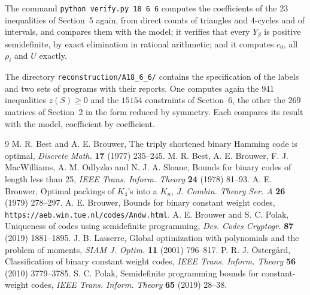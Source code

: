 \documentclass[11pt,a4paper]{article}
\begin{document}
The command \texttt{python verify.py 18 6 6} computes the coefficients of
the $23$ inequalities of Section~5 again, from direct counts of triangles
and $4$-cycles and of intervals, and compares them with the model; it
verifies that every $Y_\beta$ is positive semidefinite, by exact
elimination in rational arithmetic; and it computes $c_0$, all $\rho_i$ and
$U$ exactly.

The directory \texttt{reconstruction/A18\_6\_6/} contains the specification
of the labels and two sets of programs with their reports. One computes
again the $941$ inequalities $z(S)\ge 0$ and the $15154$ constraints of
Section~6, the other the $269$ matrices of Section~2 in the form reduced by
symmetry.
Each compares its result with the model, coefficient by coefficient.

\begin{thebibliography}{9}\small
{} M. R. Best and A. E. Brouwer, The triply shortened binary
Hamming code is optimal, \emph{Discrete Math.} \textbf{17} (1977) 235--245.
 M. R. Best, A. E. Brouwer, F. J. MacWilliams, A. M. Odlyzko
and N. J. A. Sloane, Bounds for binary codes of length less than 25,
\emph{IEEE Trans. Inform. Theory} \textbf{24} (1978) 81--93.
 A. E. Brouwer, Optimal packings of $K_4$'s into a $K_n$,
\emph{J. Combin. Theory Ser. A} \textbf{26} (1979) 278--297.
 A. E. Brouwer, Bounds for binary constant weight codes,
\texttt{https://aeb.win.tue.nl/codes/Andw.html}.
 A. E. Brouwer and S. C. Polak, Uniqueness of codes using
semidefinite programming, \emph{Des. Codes Cryptogr.} \textbf{87} (2019)
1881--1895.
 J. B. Lasserre, Global optimization with polynomials and the
problem of moments, \emph{SIAM J. Optim.} \textbf{11} (2001) 796--817.
 P. R. J. \"Osterg{\aa}rd, Classification of binary constant
weight codes, \emph{IEEE Trans. Inform. Theory} \textbf{56} (2010)
3779--3785.
 S. C. Polak, Semidefinite programming bounds for
constant-weight codes, \emph{IEEE Trans. Inform. Theory} \textbf{65}
(2019) 28--38.
\end{thebibliography}
\end{document}
